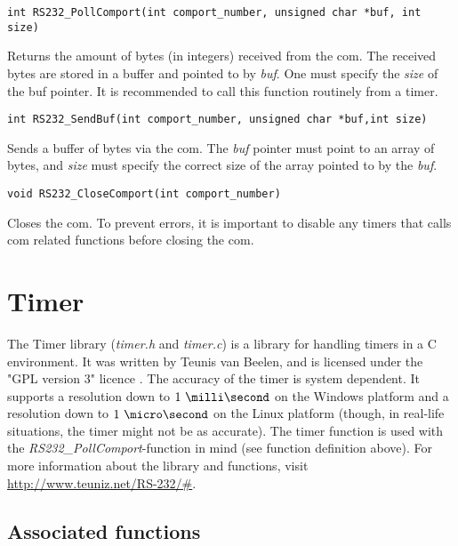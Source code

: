 \documentclass[main.tex]{subfiles}
\begin{document}
\begin{lstlisting}[frame=single] 
int RS232_PollComport(int comport_number, unsigned char *buf, int size)
\end{lstlisting}
Returns the amount of bytes (in integers) received from the \gls{com}. The received bytes are stored in a buffer and pointed to by \textit{buf}. One must specify the \textit{size} of the buf pointer. It is recommended to call this function routinely from a timer.\\

\begin{lstlisting}[frame=single] 
int RS232_SendBuf(int comport_number, unsigned char *buf,int size)
\end{lstlisting}
Sends a buffer of bytes via the \gls{com}. The \textit{buf} pointer must point to an array of bytes, and \textit{size} must specify the correct size of the array pointed to by the \textit{buf}.\\

\begin{lstlisting}[frame=single] 
void RS232_CloseComport(int comport_number)
\end{lstlisting}
Closes the \gls{com}. To prevent errors, it is important to disable any timers that calls \gls{com} related functions before closing the \gls{com}.\\

\section{Timer} \label{sec:timer}

The Timer library (\textit{timer.h} and \textit{timer.c}) is a library for handling timers in a C environment. It was written by Teunis van Beelen, and is licensed under the "GPL version 3" licence \cite{gpl3}. The accuracy of the timer is system dependent. It supports a resolution down to $1~\milli\second$ on the Windows platform and a resolution down to $1~\micro\second$ on the Linux platform (though, in real-life situations, the timer might not be as accurate). The timer function is used with the \textit{RS232\_PollComport}-function in mind (see function definition above). For more information about the library and functions, visit \url{http://www.teuniz.net/RS-232/#}.

\subsection{Associated functions}
\end{document}
